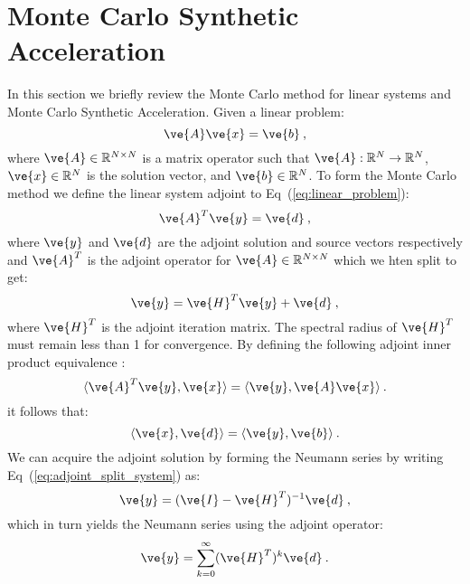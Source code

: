\documentclass[letterpaper,11pt]{article}
\begin{document}
\section{Monte Carlo Synthetic Acceleration}
\label{sec:mcsa}
In this section we briefly review the Monte Carlo method for linear
systems and Monte Carlo Synthetic Acceleration. Given a linear
problem:
\begin{equation}
  \ve{A} \ve{x} = \ve{b}\:,
  \label{eq:linear_problem}
\end{equation}
where $\ve{A} \in \mathbb{R}^{N \times N}$ is a matrix operator such
that $\ve{A} : \mathbb{R}^{N} \rightarrow \mathbb{R}^{N}$, $\ve{x} \in
\mathbb{R}^N$ is the solution vector, and $\ve{b} \in
\mathbb{R}^N$. To form the Monte Carlo method we define the linear
system adjoint to Eq~(\ref{eq:linear_problem}):
\begin{equation}
  \ve{A}^T \ve{y} = \ve{d}\:,
  \label{eq:adjoint_linear_problem}
\end{equation}
where $\ve{y}$ and $\ve{d}$ are the adjoint solution and source
vectors respectively and $\ve{A}^T$ is the adjoint operator for
$\ve{A} \in \mathbb{R}^{N \times N}$ which we hten split to get:
\begin{equation}
  \ve{y} = \ve{H}^T \ve{y} + \ve{d}\:,
  \label{eq:adjoint_split_system}
\end{equation}
where $\ve{H}^T$ is the adjoint iteration matrix. The spectral radius
of $\ve{H}^T$ must remain less than 1 for convergence. By defining the
following adjoint inner product equivalence \cite{spanier_monte_1969}:
\begin{equation}
  \langle \ve{A}^T \ve{y}, \ve{x} \rangle = \langle \ve{y}, \ve{A}
  \ve{x} \rangle\:.
  \label{eq:adjoint_operator_product}
\end{equation}
it follows that:
\begin{equation}
  \langle \ve{x}, \ve{d} \rangle = \langle \ve{y}, \ve{b} \rangle\:.
  \label{eq:adjoint_vector_relation}
\end{equation}
We can acquire the adjoint solution by forming the Neumann series by
writing Eq~(\ref{eq:adjoint_split_system}) as:
\begin{equation}
  \ve{y} = (\ve{I} - \ve{H}^T)^{-1} \ve{d}\:,
  \label{eq:adjoint_split_system_2}
\end{equation}
which in turn yields the Neumann series using the adjoint operator:
\begin{equation}
  \ve{y} = \sum_{k=0}^{\infty} (\ve{H}^T)^k\ve{d}\:.
  \label{eq:adjoint_neumann_series}
\end{equation}
\end{document}
